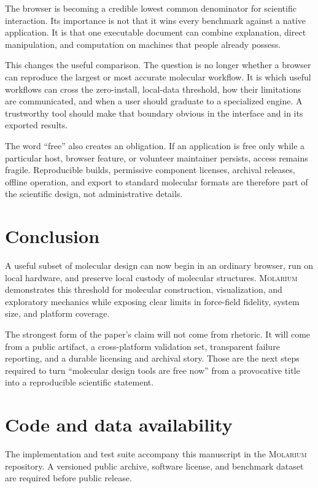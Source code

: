 \documentclass[11pt]{article}
\newcommand{\molarium}{\textsc{Molarium}}
\begin{document}
The browser is becoming a credible lowest common denominator for scientific
interaction.
Its importance is not that it wins every benchmark against a native application.
It is that one executable document can combine explanation, direct manipulation,
and computation on machines that people already possess.

This changes the useful comparison.
The question is no longer whether a browser can reproduce the largest or most
accurate molecular workflow.
It is which useful workflows can cross the zero-install, local-data threshold,
how their limitations are communicated, and when a user should graduate to a
specialized engine.
A trustworthy tool should make that boundary obvious in the interface and in its
exported results.

The word ``free'' also creates an obligation.
If an application is free only while a particular host, browser feature, or
volunteer maintainer persists, access remains fragile.
Reproducible builds, permissive component licenses, archival releases, offline
operation, and export to standard molecular formats are therefore part of the
scientific design, not administrative details.

\section{Conclusion}
\label{sec:conclusion}

A useful subset of molecular design can now begin in an ordinary browser, run on
local hardware, and preserve local custody of molecular structures.
\molarium{} demonstrates this threshold for molecular construction, visualization,
and exploratory mechanics while exposing clear limits in force-field fidelity,
system size, and platform coverage.

The strongest form of the paper's claim will not come from rhetoric.
It will come from a public artifact, a cross-platform validation set, transparent
failure reporting, and a durable licensing and archival story.
Those are the next steps required to turn ``molecular design tools are free now''
from a provocative title into a reproducible scientific statement.

\appendix


\section*{Code and data availability}

The implementation and test suite accompany this manuscript in the \molarium{}
repository.
A versioned public archive, software license, and benchmark dataset are required
before public release.
\end{document}
